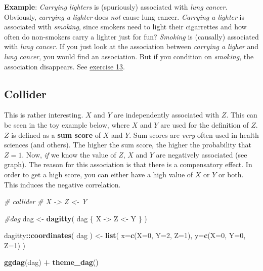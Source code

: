 \documentclass[
]{book}
\newenvironment{Shaded}{\begin{snugshade}}{\end{snugshade}}
\newcommand{\AttributeTok}[1]{\textcolor[rgb]{0.13,0.29,0.53}{#1}}
\newcommand{\CommentTok}[1]{\textcolor[rgb]{0.56,0.35,0.01}{\textit{#1}}}
\newcommand{\DecValTok}[1]{\textcolor[rgb]{0.00,0.00,0.81}{#1}}
\newcommand{\FunctionTok}[1]{\textcolor[rgb]{0.13,0.29,0.53}{\textbf{#1}}}
\newcommand{\NormalTok}[1]{#1}
\newcommand{\OtherTok}[1]{\textcolor[rgb]{0.56,0.35,0.01}{#1}}
\newcommand{\SpecialCharTok}[1]{\textcolor[rgb]{0.81,0.36,0.00}{\textbf{#1}}}
\newcommand{\StringTok}[1]{\textcolor[rgb]{0.31,0.60,0.02}{#1}}
\begin{document}
\textbf{Example}: \emph{Carrying lighters} is (spuriously) associated with \emph{lung cancer}. Obviously, \emph{carrying a lighter}
does \emph{not} cause lung cancer. \emph{Carrying a lighter} is associated with \emph{smoking}, since smokers need to light their
cigarrettes and how often do non-smokers carry a lighter just for fun?
\emph{Smoking} is (causally) associated with \emph{lung cancer}. If you just look at the association between
\emph{carrying a ligher} and \emph{lung cancer}, you would find an association. But if you condition on \emph{smoking}, the association
disappears. See \hyperref[exercise13_multiple_regression]{exercise 13}.

\subsection{Collider}\label{collider}

This is rather interesting. \(X\) and \(Y\) are independently associated
with \(Z\). This can be seen in the toy example below, where \(X\) and \(Y\) are used
for the definition of \(Z\). \(Z\) is defined as a \textbf{sum
score} of \(X\) and \(Y\). Sum scores are \emph{very} often used in health sciences (and others).
The higher the sum score, the higher the probability that \(Z=1\).
Now, \emph{if} we know the value of \(Z\), \(X\) and \(Y\) are negatively associated (see graph).
The reason for this association is that there is a compensatory effect. In order to get a high
score, you can either have a high value of \(X\) or \(Y\) or both.
This induces the negative correlation.

\begin{Shaded}
\begin{Highlighting}[]
\CommentTok{\# collider}
\CommentTok{\# X {-}\textgreater{} Z \textless{}{-} Y}

\CommentTok{\#dag}
\NormalTok{dag }\OtherTok{\textless{}{-}} \FunctionTok{dagitty}\NormalTok{( }\StringTok{\textquotesingle{}dag \{}
\StringTok{  X {-}\textgreater{} Z \textless{}{-} Y}
\StringTok{\}\textquotesingle{}}\NormalTok{ )}

\NormalTok{dagitty}\SpecialCharTok{::}\FunctionTok{coordinates}\NormalTok{( dag ) }\OtherTok{\textless{}{-}}
  \FunctionTok{list}\NormalTok{( }\AttributeTok{x=}\FunctionTok{c}\NormalTok{(}\AttributeTok{X=}\DecValTok{0}\NormalTok{, }\AttributeTok{Y=}\DecValTok{2}\NormalTok{, }\AttributeTok{Z=}\DecValTok{1}\NormalTok{),}
        \AttributeTok{y=}\FunctionTok{c}\NormalTok{(}\AttributeTok{X=}\DecValTok{0}\NormalTok{, }\AttributeTok{Y=}\DecValTok{0}\NormalTok{, }\AttributeTok{Z=}\DecValTok{1}\NormalTok{) )}

\FunctionTok{ggdag}\NormalTok{(dag) }\SpecialCharTok{+} \FunctionTok{theme\_dag}\NormalTok{()}
\end{Highlighting}
\end{Shaded}
\end{document}
